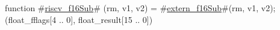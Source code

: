 function #\hyperref[sailRISCVzriscvzyf16Sub]{riscv\_f16Sub}# (rm, v1, v2) = {
  #\hyperref[sailRISCVzexternzyf16Sub]{extern\_f16Sub}#(rm, v1, v2);
  (float_fflags[4 .. 0], float_result[15 .. 0])
}
